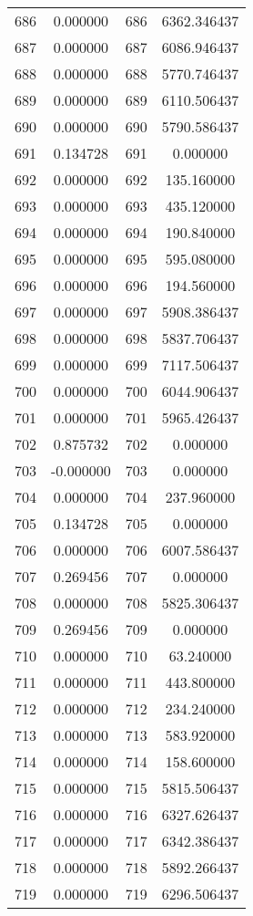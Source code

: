 \documentclass[12pt]{article}
\begin{document}
\begin{longtable}{@{}cccc@{}}
686 & 0.000000 & 686 & 6362.346437 \\
687 & 0.000000 & 687 & 6086.946437 \\
688 & 0.000000 & 688 & 5770.746437 \\
689 & 0.000000 & 689 & 6110.506437 \\
690 & 0.000000 & 690 & 5790.586437 \\
691 & 0.134728 & 691 & 0.000000 \\
692 & 0.000000 & 692 & 135.160000 \\
693 & 0.000000 & 693 & 435.120000 \\
694 & 0.000000 & 694 & 190.840000 \\
695 & 0.000000 & 695 & 595.080000 \\
696 & 0.000000 & 696 & 194.560000 \\
697 & 0.000000 & 697 & 5908.386437 \\
698 & 0.000000 & 698 & 5837.706437 \\
699 & 0.000000 & 699 & 7117.506437 \\
700 & 0.000000 & 700 & 6044.906437 \\
701 & 0.000000 & 701 & 5965.426437 \\
702 & 0.875732 & 702 & 0.000000 \\
703 & -0.000000 & 703 & 0.000000 \\
704 & 0.000000 & 704 & 237.960000 \\
705 & 0.134728 & 705 & 0.000000 \\
706 & 0.000000 & 706 & 6007.586437 \\
707 & 0.269456 & 707 & 0.000000 \\
708 & 0.000000 & 708 & 5825.306437 \\
709 & 0.269456 & 709 & 0.000000 \\
710 & 0.000000 & 710 & 63.240000 \\
711 & 0.000000 & 711 & 443.800000 \\
712 & 0.000000 & 712 & 234.240000 \\
713 & 0.000000 & 713 & 583.920000 \\
714 & 0.000000 & 714 & 158.600000 \\
715 & 0.000000 & 715 & 5815.506437 \\
716 & 0.000000 & 716 & 6327.626437 \\
717 & 0.000000 & 717 & 6342.386437 \\
718 & 0.000000 & 718 & 5892.266437 \\
719 & 0.000000 & 719 & 6296.506437 \\

\end{longtable}
\end{document}
